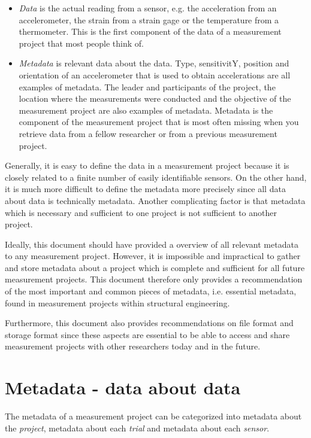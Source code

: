 \documentclass{article}
\begin{document}
\begin{itemize}
\item \emph{Data} is the actual reading from a sensor, e.g. the
  acceleration from an accelerometer, the strain from a strain gage or
  the temperature from a thermometer. This is the first component of
  the data of a measurement project that most people think of.

\item \emph{Metadata} is relevant data about the data. Type, sensitivitY,
  position and orientation of an accelerometer that is used to obtain
  accelerations are all examples of metadata. The leader and
  participants of the project, the location where the measurements
  were conducted and the objective of the measurement project are also
  examples of metadata. Metadata is the component of the measurement
  project that is most often missing when you retrieve data from a
  fellow researcher or from a previous measurement project.
\end{itemize}


Generally, it is easy to define the data in a measurement project
because it is closely related to a finite number of easily
identifiable sensors. On the other hand, it is much more difficult to
define the metadata more precisely since all data about data is
technically metadata. Another complicating factor is that metadata
which is necessary and sufficient to one project is not sufficient
to another project.

Ideally, this document should have provided a overview of all relevant
metadata to any measurement project. However, it is impossible and
impractical to gather and store metadata about a project which is
complete and sufficient for all future measurement projects. This
document therefore only provides a recommendation of the most important and
common pieces of metadata, i.e. essential metadata, found in
measurement projects within structural engineering.

Furthermore, this document also provides recommendations on file
format and storage format since these aspects are essential to be able
to access and share measurement projects with other researchers today
and in the future.

\section{Metadata - data about data}

The metadata of a measurement project can be categorized into metadata about the \emph{project}, metadata about each \emph{trial}  and metadata about each \emph{sensor}.
\end{document}
